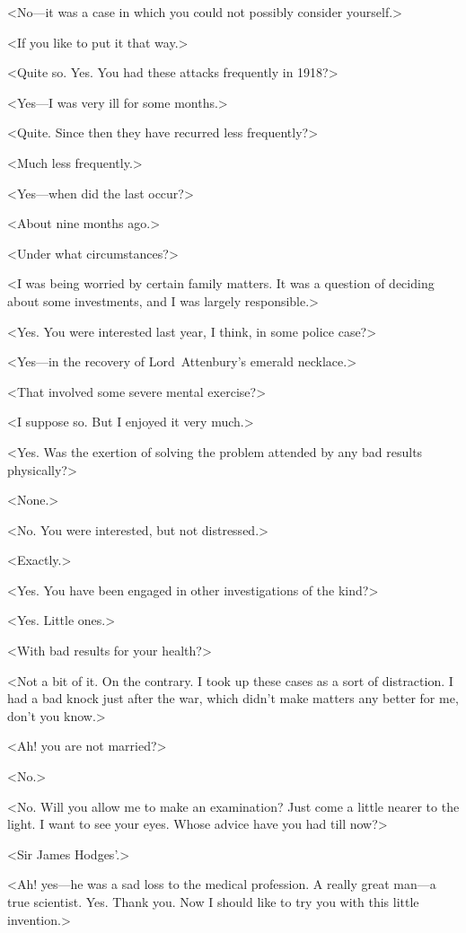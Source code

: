 <No—it was a case in which you could not possibly consider yourself.>

<If you like to put it that way.>

<Quite so. Yes. You had these attacks frequently in 1918?>

<Yes—I was very ill for some months.>

<Quite. Since then they have recurred less frequently?>

<Much less frequently.>

<Yes—when did the last occur?>

<About nine months ago.>

<Under what circumstances?>

<I was being worried by certain family matters. It was a question of deciding about some investments, and I was largely responsible.>

<Yes. You were interested last year, I think, in some police case?>

<Yes—in the recovery of Lord~Attenbury's emerald necklace.>

<That involved some severe mental exercise?>

<I suppose so. But I enjoyed it very much.>

<Yes. Was the exertion of solving the problem attended by any bad results physically?>

<None.>

<No. You were interested, but not distressed.>

<Exactly.>

<Yes. You have been engaged in other investigations of the kind?>

<Yes. Little ones.>

<With bad results for your health?>

<Not a bit of it. On the contrary. I took up these cases as a sort of distraction. I had a bad knock just after the war, which didn't make matters any better for me, don't you know.>

<Ah! you are not married?>

<No.>

<No. Will you allow me to make an examination? Just come a little nearer to the light. I want to see your eyes. Whose advice have you had till now?>

<Sir James Hodges'.>

<Ah! yes—he was a sad loss to the medical profession. A really great man—a true scientist. Yes. Thank you. Now I should like to try you with this little invention.>

